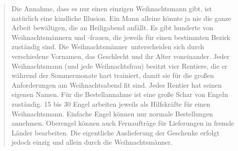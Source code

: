 \begin{quotation}
\noindent Die Annahme, dass es nur einen einzigen Weihnachtsmann gibt, ist
natürlich eine kindliche Illusion. Ein Mann alleine könnte ja nie die ganze
Arbeit bewältigen, die an Heiligabend anfällt. Es gibt hunderte von
Weihnachtsmännern und -frauen, die jeweils für einen bestimmten Bezirk
zuständig sind. Die Weihnachts\glqq männer\grqq\ unterscheiden sich durch
verschiedene Vornamen, das Geschlecht und ihr Alter voneinander. Jeder
Weihnachtsmann (und jede Weihnachtsfrau) besitzt vier Rentiere, die er während
der Sommermonate hart trainiert, damit sie für die großen Anforderungen am
Weihnachtsabend fit sind. Jedes Rentier hat seinen eigenen Namen. Für die
Bestellannahme ist eine große Schar von Engeln zuständig. 15 bis 30 Engel
arbeiten jeweils als Hilfskräfte für einen Weihnachtsmann. Einfache Engel
können nur normale Bestellungen annehmen. Oberengel können auch Fernaufträge
für Lieferungen in fremde Länder bearbeiten. Die eigentliche Auslieferung der
Geschenke erfolgt jedoch einzig und allein durch die Weihnachtsmänner.
\end{quotation}
